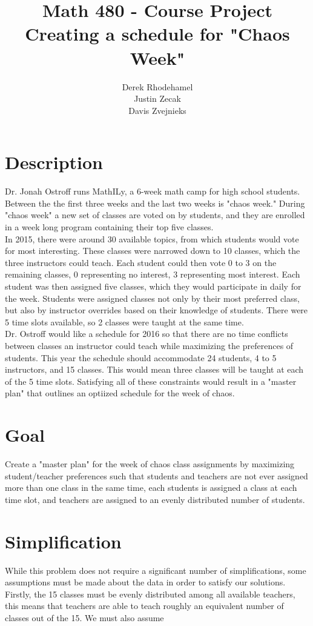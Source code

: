 \documentclass[11pt]{article}
\title{\textbf{Math 480 - Course Project}
			  \\Creating a schedule for "Chaos Week"}
\author{Derek Rhodehamel\\
		Justin Zecak\\
		Davis Zvejnieks}
\date{}
\begin{document}
\maketitle

\section{Description}
Dr. Jonah Ostroff runs MathILy, a 6-week math camp for high school students. Between the the first three weeks and the last two weeks is "chaos week." During "chaos week" a new set of classes are voted on by students, and they are enrolled in a week long program containing their top five classes.\\
\indent In 2015, there were around 30 available topics, from which students would vote for most interesting. These classes were narrowed down to 10 classes, which the three instructors could teach. Each student could then vote 0 to 3 on the remaining classes, 0 representing no interest, 3 representing most interest. Each student was then assigned five classes, which they would participate in daily for the week. Students were assigned classes not only by their most preferred class, but also by instructor overrides based on their knowledge of students. There were 5 time slots available, so 2 classes were taught at the same time.\\
\indent Dr. Ostroff would like a schedule for 2016 so that there are no time conflicts between classes an instructor could teach while maximizing the preferences of students. This year the schedule should accommodate 24 students, 4 to 5 instructors, and 15 classes. This would mean three classes will be taught at each of the 5 time slots. Satisfying all of these constraints would result in a "master plan" that outlines an optiized schedule for the week of chaos.

\section{Goal}
Create a "master plan" for the week of chaos class assignments by maximizing student/teacher preferences such that students and teachers are not ever assigned more than one class in the same time, each students is assigned a class at each time slot, and teachers are assigned to an evenly distributed number of students.

\section{Simplification}
While this problem does not require a significant number of simplifications, some assumptions must be made about the data in order to satisfy our solutions. Firstly, the 15 classes must be evenly distributed among all available teachers, this means that teachers are able to teach roughly an equivalent number of classes out of the 15. We must also assume 
\end{document}
